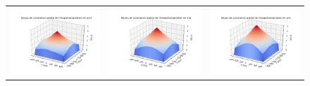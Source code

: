 \documentclass[a4paper,11pt]{article}
\numberwithin{equation}{section}
\begin{document}
\begin{figure}[H]
\begin{tabular}{ccc}
	\includegraphics[scale=0.34]{images/kernel_evap_m4.png} & \includegraphics[scale=0.34]{images/kernel_evap_m5.png} & \includegraphics[scale=0.34]{images/kernel_evap_m6.png} \\
\end{tabular}


\end{figure}
\end{document}
